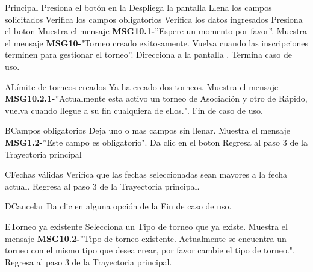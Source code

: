 	\newpage
	\begin{UCtrayectoria}{Principal}
	\UCpaso[\UCactor] Presiona el botón  en la 
	\UCpaso Despliega la pantalla  
	\UCpaso[\UCactor] Llena los campos solicitados	
	\UCpaso Verifica los campos obligatorios  
	\UCpaso Verifica los datos ingresados  
	\UCpaso[\UCactor] Presiona el boton  
	\UCpaso Muestra el mensaje {\bf MSG10.1-}''Espere un momento por favor''.
	\UCpaso Muestra el mensaje {\bf MSG10-}"Torneo creado exitosamente. Vuelva cuando las inscripciones terminen para gestionar el torneo''. 
	\UCpaso Direcciona a la pantalla .
	\UCpaso Termina caso de uso.
\end{UCtrayectoria}

\begin{UCtrayectoriaA}{A}{Límite de torneos creados}
	\UCpaso[\UCactor] Ya ha creado dos torneos.
	\UCpaso Muestra el mensaje {\bf MSG10.2.1-}''Actualmente esta activo un torneo de Asociación y otro de Rápido, vuelva cuando llegue a su fin cualquiera de ellos.".
	\UCpaso Fin de caso de uso.
\end{UCtrayectoriaA}

\begin{UCtrayectoriaA}{B}{Campos obligatorios}
	\UCpaso[\UCactor] Deja uno o mas campos sin llenar.
	\UCpaso Muestra el mensaje {\bf MSG1.2-}''Este campo es obligatorio".
	\UCpaso[\UCactor] Da clic en el boton 
	\UCpaso Regresa al paso 3 de la Trayectoria principal
\end{UCtrayectoriaA}

\begin{UCtrayectoriaA}{C}{Fechas válidas}
	\UCpaso Verifica que las fechas seleccionadas sean mayores a la fecha actual.
	\UCpaso Regresa al paso 3 de la Trayectoria principal.
\end{UCtrayectoriaA}

\begin{UCtrayectoriaA}{D}{Cancelar}
	\UCpaso[\UCactor] Da clic en alguna opción de la  
	\UCpaso Fin de caso de uso.
\end{UCtrayectoriaA}

\begin{UCtrayectoriaA}{E}{Torneo ya existente}
	\UCpaso[\UCactor] Selecciona un Tipo de torneo que ya existe.
	\UCpaso Muestra el mensaje {\bf MSG10.2-}''Tipo de torneo existente. Actualmente se encuentra un torneo con el mismo tipo que desea crear, por favor cambie el tipo de torneo.".
	\UCpaso Regresa al paso 3 de la Trayectoria principal.
\end{UCtrayectoriaA}
